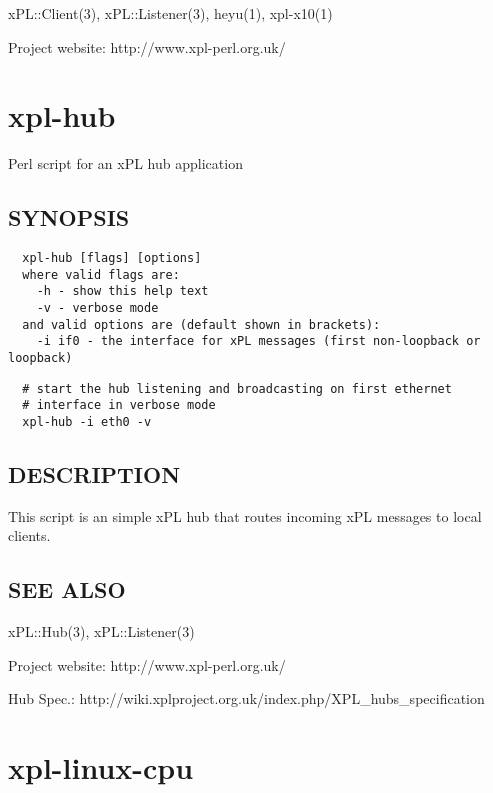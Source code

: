\documentclass[12pt,a4paper]{article}
\begin{document}
xPL::Client(3), xPL::Listener(3), heyu(1), xpl-x10(1)



Project website: http://www.xpl-perl.org.uk/

\newpage
\section{xpl-hub\label{xpl-hub}}


Perl script for an xPL hub application

\subsection*{SYNOPSIS\label{xpl-hub_SYNOPSIS}}
\begin{verbatim}
  xpl-hub [flags] [options]
  where valid flags are:
    -h - show this help text
    -v - verbose mode
  and valid options are (default shown in brackets):
    -i if0 - the interface for xPL messages (first non-loopback or loopback)
\end{verbatim}
\begin{verbatim}
  # start the hub listening and broadcasting on first ethernet
  # interface in verbose mode
  xpl-hub -i eth0 -v
\end{verbatim}
\subsection*{DESCRIPTION\label{xpl-hub_DESCRIPTION}}


This script is an simple xPL hub that routes incoming xPL messages to
local clients.

\subsection*{SEE ALSO\label{xpl-hub_SEE_ALSO}}


xPL::Hub(3), xPL::Listener(3)



Project website: http://www.xpl-perl.org.uk/



Hub Spec.: http://wiki.xplproject.org.uk/index.php/XPL\_hubs\_specification

\newpage
\section{xpl-linux-cpu\label{xpl-linux-cpu}}
\end{document}
